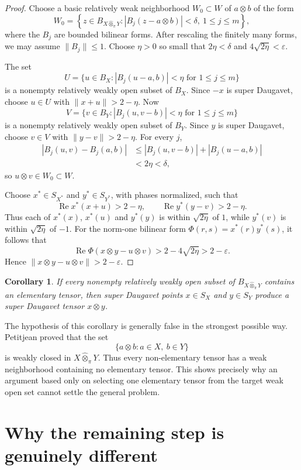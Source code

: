 \documentclass[11pt]{article}
\newtheorem{corollary}[theorem]{Corollary}
\theoremstyle{definition}
\newcommand{\whotpi}{\widehat{\otimes}_{\pi}}
\newcommand{\Ree}{\operatorname{Re}}
\begin{document}
\begin{proof}
Choose a basic relatively weak neighborhood $W_0\subset W$ of $a\otimes b$
of the form
\[
 W_0=\left\{z\in B_{X\whotpi Y}:
 |B_j(z-a\otimes b)|<\delta,
 \ 1\le j\le m\right\},
\]
where the $B_j$ are bounded bilinear forms.  After rescaling the finitely many
forms, we may assume $\|B_j\|\le1$.  Choose $\eta>0$ so small that
$2\eta<\delta$ and $4\sqrt{2\eta}<\varepsilon$.

The set
\[
 U=\{u\in B_X:|B_j(u-a,b)|<\eta\text{ for }1\le j\le m\}
\]
is a nonempty relatively weakly open subset of $B_X$.  Since $-x$ is super
Daugavet, choose $u\in U$ with $\|x+u\|>2-\eta$.  Now
\[
 V=\{v\in B_Y:|B_j(u,v-b)|<\eta\text{ for }1\le j\le m\}
\]
is a nonempty relatively weakly open subset of $B_Y$.  Since $y$ is super
Daugavet, choose $v\in V$ with $\|y-v\|>2-\eta$.
For every $j$,
\begin{align*}
 |B_j(u,v)-B_j(a,b)|
 &\le |B_j(u,v-b)|+|B_j(u-a,b)|\\
 &<2\eta<\delta,
\end{align*}
so $u\otimes v\in W_0\subset W$.

Choose $x^*\in S_{X^*}$ and $y^*\in S_{Y^*}$, with phases normalized, such
that
\[
 \Ree x^*(x+u)>2-\eta,
 \qquad
 \Ree y^*(y-v)>2-\eta.
\]
Thus each of $x^*(x)$, $x^*(u)$ and $y^*(y)$ is within
$\sqrt{2\eta}$ of $1$, while $y^*(v)$ is within $\sqrt{2\eta}$ of $-1$.
For the norm-one bilinear form $\Phi(r,s)=x^*(r)y^*(s)$, it follows that
\[
 \Ree\Phi(x\otimes y-u\otimes v)>2-4\sqrt{2\eta}>2-\varepsilon.
\]
Hence $\|x\otimes y-u\otimes v\|>2-\varepsilon$.
\end{proof}

\begin{corollary}
If every nonempty relatively weakly open subset of $B_{X\whotpi Y}$ contains
an elementary tensor, then super Daugavet points $x\in S_X$ and $y\in S_Y$
produce a super Daugavet tensor $x\otimes y$.
\end{corollary}

The hypothesis of this corollary is generally false in the strongest possible
way.  Petitjean proved that the set
\[
       \{a\otimes b:a\in X,\ b\in Y\}
\]
is weakly closed in $X\whotpi Y$.  Thus every non-elementary tensor has a
weak neighborhood containing no elementary tensor.  This shows precisely why
an argument based only on selecting one elementary tensor from the target weak
open set cannot settle the general problem.

\section{Why the remaining step is genuinely different}\label{sec:obstruction}
\end{document}
